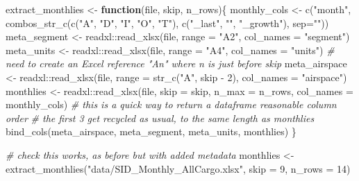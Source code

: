 \documentclass[
]{book}
\newenvironment{Shaded}{\begin{snugshade}}{\end{snugshade}}
\newcommand{\AttributeTok}[1]{\textcolor[rgb]{0.77,0.63,0.00}{#1}}
\newcommand{\CommentTok}[1]{\textcolor[rgb]{0.56,0.35,0.01}{\textit{#1}}}
\newcommand{\ControlFlowTok}[1]{\textcolor[rgb]{0.13,0.29,0.53}{\textbf{#1}}}
\newcommand{\DecValTok}[1]{\textcolor[rgb]{0.00,0.00,0.81}{#1}}
\newcommand{\FunctionTok}[1]{\textcolor[rgb]{0.00,0.00,0.00}{#1}}
\newcommand{\NormalTok}[1]{#1}
\newcommand{\OtherTok}[1]{\textcolor[rgb]{0.56,0.35,0.01}{#1}}
\newcommand{\SpecialCharTok}[1]{\textcolor[rgb]{0.00,0.00,0.00}{#1}}
\newcommand{\StringTok}[1]{\textcolor[rgb]{0.31,0.60,0.02}{#1}}
\begin{document}
\begin{Shaded}
\begin{Highlighting}[]
\NormalTok{extract\_monthlies }\OtherTok{\textless{}{-}} \ControlFlowTok{function}\NormalTok{(file, skip, n\_rows)\{}
\NormalTok{  monthly\_cols }\OtherTok{\textless{}{-}} \FunctionTok{c}\NormalTok{(}\StringTok{"month"}\NormalTok{, }
                    \FunctionTok{combos\_str\_c}\NormalTok{(}\FunctionTok{c}\NormalTok{(}\StringTok{"A"}\NormalTok{, }\StringTok{"D"}\NormalTok{, }\StringTok{"I"}\NormalTok{, }\StringTok{"O"}\NormalTok{, }\StringTok{"T"}\NormalTok{), }
                                 \FunctionTok{c}\NormalTok{(}\StringTok{"\_last"}\NormalTok{, }\StringTok{""}\NormalTok{, }\StringTok{"\_growth"}\NormalTok{),}
                                 \AttributeTok{sep=}\StringTok{""}\NormalTok{))}
\NormalTok{  meta\_segment }\OtherTok{\textless{}{-}}\NormalTok{ readxl}\SpecialCharTok{::}\FunctionTok{read\_xlsx}\NormalTok{(file, }\AttributeTok{range =} \StringTok{"A2"}\NormalTok{, }
                                    \AttributeTok{col\_names =} \StringTok{"segment"}\NormalTok{) }
\NormalTok{  meta\_units }\OtherTok{\textless{}{-}}\NormalTok{ readxl}\SpecialCharTok{::}\FunctionTok{read\_xlsx}\NormalTok{(file, }\AttributeTok{range =} \StringTok{"A4"}\NormalTok{, }
                                  \AttributeTok{col\_names =} \StringTok{"units"}\NormalTok{)}
  \CommentTok{\# need to create an Excel reference "An" where n is just before skip}
\NormalTok{  meta\_airspace }\OtherTok{\textless{}{-}}\NormalTok{ readxl}\SpecialCharTok{::}\FunctionTok{read\_xlsx}\NormalTok{(file, }\AttributeTok{range =} \FunctionTok{str\_c}\NormalTok{(}\StringTok{"A"}\NormalTok{, skip }\SpecialCharTok{{-}} \DecValTok{2}\NormalTok{), }
                                     \AttributeTok{col\_names =} \StringTok{"airspace"}\NormalTok{)}
\NormalTok{  monthlies }\OtherTok{\textless{}{-}}\NormalTok{ readxl}\SpecialCharTok{::}\FunctionTok{read\_xlsx}\NormalTok{(file, }\AttributeTok{skip =}\NormalTok{ skip, }\AttributeTok{n\_max =}\NormalTok{ n\_rows, }
                                 \AttributeTok{col\_names =}\NormalTok{ monthly\_cols) }
  \CommentTok{\# this is a quick way to return a dataframe reasonable column order}
  \CommentTok{\# the first 3 get recycled as usual, to the same length as monthlies}
  \FunctionTok{bind\_cols}\NormalTok{(meta\_airspace, meta\_segment, meta\_units, monthlies)}
\NormalTok{\}}

\CommentTok{\# check this works, as before but with added metadata}
\NormalTok{monthlies }\OtherTok{\textless{}{-}} \FunctionTok{extract\_monthlies}\NormalTok{(}\StringTok{"data/SID\_Monthly\_AllCargo.xlsx"}\NormalTok{, }\AttributeTok{skip =} \DecValTok{9}\NormalTok{, }\AttributeTok{n\_rows =} \DecValTok{14}\NormalTok{)}
\end{Highlighting}
\end{Shaded}
\end{document}
